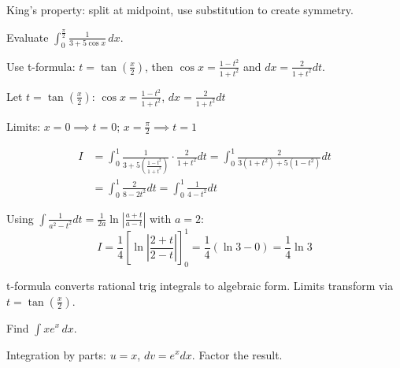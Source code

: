 \begin{takeaways}
King's property: split at midpoint, use substitution to create symmetry.
\end{takeaways}

\vspace{1cm}

\begin{problem}
Evaluate $\displaystyle \int_{0}^{\frac{\pi}{2}} \frac{1}{3 + 5\cos x} \, dx$.
\end{problem}

\begin{hint}
Use t-formula: $t = \tan(\frac{x}{2})$, then $\cos x = \frac{1-t^2}{1+t^2}$ and $dx = \frac{2}{1+t^2}dt$.
\end{hint}

\begin{solution}
Let $t = \tan(\frac{x}{2})$: $\cos x = \frac{1-t^2}{1+t^2}$, $dx = \frac{2}{1+t^2}dt$

Limits: $x=0 \implies t=0$; $x=\frac{\pi}{2} \implies t=1$

\begin{align*}
I &= \int_0^1 \frac{1}{3 + 5\left(\frac{1-t^2}{1+t^2}\right)} \cdot \frac{2}{1+t^2} dt = \int_0^1 \frac{2}{3(1+t^2) + 5(1-t^2)} dt \\
&= \int_0^1 \frac{2}{8-2t^2} dt = \int_0^1 \frac{1}{4-t^2} dt
\end{align*}

Using $\int \frac{1}{a^2-t^2}dt = \frac{1}{2a}\ln\left|\frac{a+t}{a-t}\right|$ with $a=2$:
\[
I = \frac{1}{4}\left[\ln\left|\frac{2+t}{2-t}\right|\right]_0^1 = \frac{1}{4}(\ln 3 - 0) = \boxed{\frac{1}{4}\ln 3}
\]
\end{solution}

\begin{takeaways}
t-formula converts rational trig integrals to algebraic form. Limits transform via $t = \tan(\frac{x}{2})$.
\end{takeaways}

\vspace{1cm}

\begin{problem}
Find $\displaystyle \int x e^x \, dx$.
\end{problem}

\begin{hint}
Integration by parts: $u=x$, $dv=e^x dx$. Factor the result.
\end{hint}

